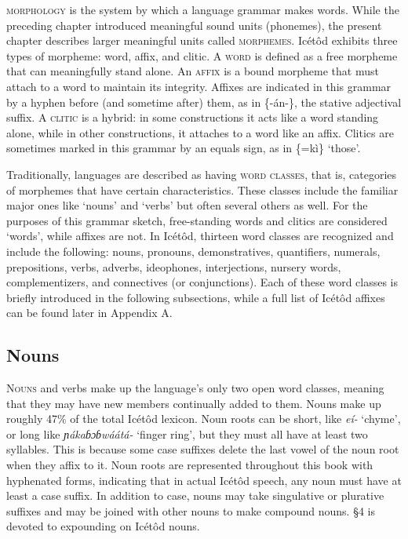 \textsc{morphology} is the system by which a language grammar makes words. While the preceding chapter introduced meaningful sound units (phonemes), the present chapter describes larger meaningful units called \textsc{morphemes}. Icétôd exhibits three types of morpheme: word, affix, and clitic. A \textsc{word} is defined as a free morpheme that can meaningfully stand alone. An \textsc{affix} is a bound morpheme that must attach to a word to maintain its integrity. Affixes are indicated in this grammar by a hyphen before (and sometime after) them, as in \{-án-\}, the stative adjectival suffix. A \textsc{clitic} is a hybrid: in some constructions it acts like a word standing alone, while in other constructions, it attaches to a word like an affix. Clitics are sometimes marked in this grammar by an equals sign, as in \{=kì\} ‘those’. 

Traditionally, languages are described as having \textsc{word classes}, that is, categories of morphemes that have certain characteristics. These classes include the familiar major ones like ‘nouns’ and ‘verbs’ but often several others as well. For the purposes of this grammar sketch, free-standing words and clitics are considered ‘words’, while affixes are not. In Icétôd, thirteen word classes are recognized and include the following: nouns, pronouns, demonstratives, quantifiers, numerals, prepositions, verbs, adverbs, ideophones, interjections, nursery words, complementizers, and connectives (or conjunctions). Each of these word classes is briefly introduced in the following subsections, while a full list of Icétôd affixes can be found later in Appendix A.
 
\subsection{Nouns}


\textsc{Nouns} and verbs make up the language’s only two open word classes, meaning that they may have new members continually added to them. Nouns make up roughly 47\% of the total Icétôd lexicon. Noun roots can be short, like \textit{eí- }‘chyme’, or long like \textit{ɲákaɓɔɓwáátá- }‘finger ring’, but they must all have at least two syllables. This is because some case suffixes delete the last vowel of the noun root when they affix to it. Noun roots are represented throughout this book with hyphenated forms, indicating that in actual Icétôd speech, any noun must have at least a case suffix. In addition to case, nouns may take singulative or plurative suffixes and may be joined with other nouns to make compound nouns. §4 is devoted to expounding on Icétôd nouns.
 
